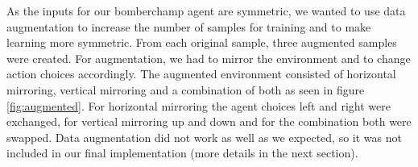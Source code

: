 \newline
\newline
\newline
\newline
As the inputs for our bomberchamp agent are symmetric, we wanted to use data augmentation to increase the number of samples for training and to make learning more symmetric.
From each original sample, three augmented samples were created. For augmentation, we had to mirror the environment and to change action choices accordingly. The augmented environment consisted of horizontal mirroring, vertical mirroring and a combination of both as seen in figure \ref{fig:augmented}.
For horizontal mirroring the agent choices left and right were exchanged, for vertical mirroring up and down and for the combination both were swapped. \newline
Data augmentation did not work as well as we expected, so it was not included in our final implementation (more details in the next section).